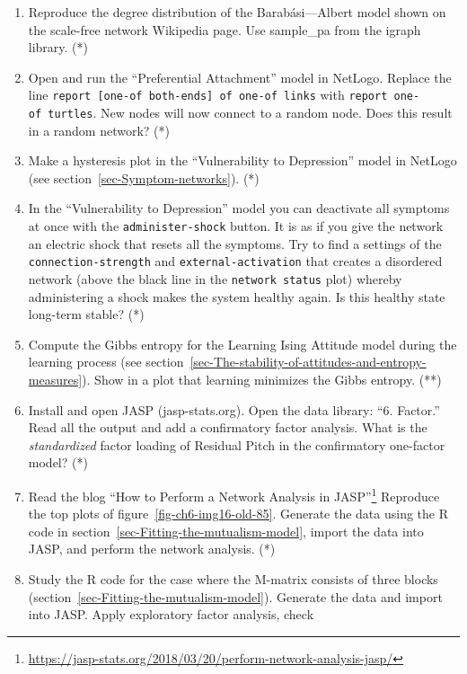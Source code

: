 \documentclass[
  a4paper,
  DIV=11,
  numbers=noendperiod,
  oneside]{scrreprt}
\begin{document}
\begin{enumerate}
\def\labelenumi{\arabic{enumi})}
\item
  Reproduce the degree distribution of the Barabási---Albert model shown
  on the scale-free network Wikipedia page. Use sample\_pa from the
  igraph library. (*)
\item
  Open and run the ``Preferential Attachment'' model in NetLogo. Replace
  the line \texttt{report\ {[}one-of\ both-ends{]}\ of\ one-of\ links}
  with \texttt{report\ one-of\ turtles}. New nodes will now connect to a
  random node. Does this result in a random network? (*)
\item
  Make a hysteresis plot in the ``Vulnerability to Depression'' model in
  NetLogo (see section~\ref{sec-Symptom-networks}). (*)
\item
  In the ``Vulnerability to Depression'' model you can deactivate all
  symptoms at once with the \texttt{administer-shock} button. It is as
  if you give the network an electric shock that resets all the
  symptoms. Try to find a settings of the \texttt{connection-strength}
  and \texttt{external-activation} that creates a disordered network
  (above the black line in the \texttt{network\ status} plot) whereby
  administering a shock makes the system healthy again. Is this healthy
  state long-term stable? (*)
\item
  Compute the Gibbs entropy for the Learning Ising Attitude model during
  the learning process (see
  section~\ref{sec-The-stability-of-attitudes-and-entropy-measures}).
  Show in a plot that learning minimizes the Gibbs entropy. (**)
\item
  Install and open JASP (jasp-stats.org). Open the data library: ``6.
  Factor.'' Read all the output and add a confirmatory factor analysis.
  What is the \emph{standardized} factor loading of Residual Pitch in
  the confirmatory one-factor model? (*)
\item
  Read the blog ``How to Perform a Network Analysis in JASP''\footnote{\url{https://jasp-stats.org/2018/03/20/perform-network-analysis-jasp/}}
  Reproduce the top plots of figure~\ref{fig-ch6-img16-old-85}. Generate
  the data using the R code in
  section~\ref{sec-Fitting-the-mutualism-model}, import the data into
  JASP, and perform the network analysis. (*)
\item
  Study the R code for the case where the M-matrix consists of three
  blocks (section~\ref{sec-Fitting-the-mutualism-model}). Generate the
  data and import into JASP. Apply exploratory factor analysis, check

\end{enumerate}
\end{document}
